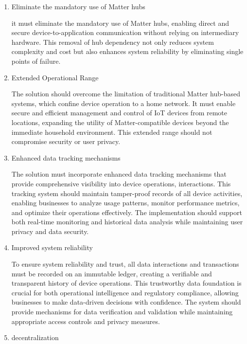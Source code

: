 \documentclass[conference]{IEEEtran}
\begin{document}
\begin{enumerate}[itemsep=2ex, parsep=1ex]
	\item Eliminate the mandatory use of Matter hubs 
	       
	      it must eliminate the mandatory use of Matter hubs, enabling direct and secure device-to-application communication without relying on intermediary hardware. This removal of hub dependency not only reduces system complexity and cost but also enhances system reliability by eliminating single points of failure.
	      
	\item Extended Operational Range
	      
	      The solution should overcome the limitation of traditional Matter hub-based systems, which confine device operation to a home network. It must enable secure and efficient management and control of IoT devices from remote locations, expanding the utility of Matter-compatible devices beyond the immediate household environment. This extended range should not compromise security or user privacy.
	      
	\item Enhanced data tracking mechanisms
	      
	      The solution must incorporate enhanced data tracking mechanisms that provide comprehensive visibility into device operations, interactions. This tracking system should maintain tamper-proof records of all device activities, enabling businesses to analyze usage patterns, monitor performance metrics, and optimize their operations effectively. The implementation should support both real-time monitoring and historical data analysis while maintaining user privacy and data security.
	      
	\item Improved system reliability
	      
	      To ensure system reliability and trust, all data interactions and transactions must be recorded on an immutable ledger, creating a verifiable and transparent history of device operations. This trustworthy data foundation is crucial for both operational intelligence and regulatory compliance, allowing businesses to make data-driven decisions with confidence. The system should provide mechanisms for data verification and validation while maintaining appropriate access controls and privacy measures.
	      
	\item decentralization
	      

\end{enumerate}
\end{document}
